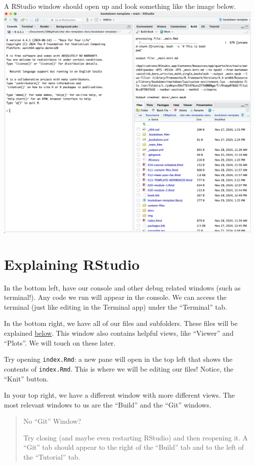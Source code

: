 \documentclass[
]{book}
\theoremstyle{definition}
\theoremstyle{definition}
\theoremstyle{definition}
\theoremstyle{definition}
\theoremstyle{remark}
\begin{document}
A RStudio window should open up and look something like the image below.
\includegraphics{img/files-and-build/newly-opened-RStudio.png}\\

\section{Explaining RStudio}\label{explaining-rstudio}

In the bottom left, have our console and other debug related windows (such as terminal!). Any code we run will appear in the console. We can access the terminal (just like editing in the Terminal app) under the ``Terminal'' tab.

In the bottom right, we have all of our files and subfolders. These files will be explained \hyperref[file-setup]{below}. This window also contains helpful views, like ``Viewer'' and ``Plots''. We will touch on these later.

Try opening \texttt{index.Rmd}: a new pane will open in the top left that shows the contents of \texttt{index.Rmd}. This is where we will be editing our files! Notice, the ``Knit'' button.

In your top right, we have a different window with more different views. The most relevant windows to us are the ``Build'' and the ``Git'' windows.

\begin{quote}
No ``Git'' Window?

Try closing (and maybe even restarting RStudio) and then reopening it. A ``Git'' tab should appear to the right of the ``Build'' tab and to the left of the ``Tutorial'' tab.
\end{quote}
\end{document}
